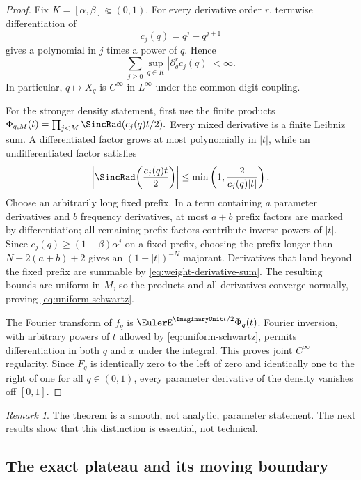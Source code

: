 \documentclass[11pt,oneside]{article}
\theoremstyle{definition}
\theoremstyle{remark}
\newtheorem{remark}[theorem]{Remark}
\begin{document}
\begin{proof}
Fix \(K=[\alpha,\beta]\Subset(0,1)\).  For every derivative order \(r\), termwise
differentiation of
\[
 c_j(q)=q^j-q^{j+1}
\]
gives a polynomial in \(j\) times a power of \(q\).  Hence
\begin{equation}
 \sum_{j\ge0}\sup_{q\in K}|\partial_q^r c_j(q)|<\infty.
 \label{eq:weight-derivative-sum}
\end{equation}
In particular, \(q\mapsto X_q\) is \(C^\infty\) in \(L^\infty\) under the common-digit
coupling.

For the stronger density statement, first use the finite products
\(
 \Phi_{q,M}(t)=\prod_{j<M}\SincRad(c_j(q)t/2).
\)
Every mixed derivative is a finite Leibniz sum.  A differentiated factor grows at most
polynomially in \(|t|\), while an undifferentiated factor satisfies
\[
 \left|\SincRad\!\left(\frac{c_j(q)t}{2}\right)\right|
 \le \min\left(1,\frac{2}{c_j(q)|t|}\right).
\]
Choose an arbitrarily long fixed prefix.  In a term containing \(a\) parameter derivatives
and \(b\) frequency derivatives, at most \(a+b\) prefix factors are marked by differentiation;
all remaining prefix factors contribute inverse powers of \(|t|\).  Since
\(c_j(q)\ge(1-\beta)\alpha^j\) on a fixed prefix, choosing the prefix longer than
\(N+2(a+b)+2\) gives an \((1+|t|)^{-N}\) majorant.  Derivatives that land beyond the fixed
prefix are summable by \eqref{eq:weight-derivative-sum}.  The resulting bounds are uniform in
\(M\), so the products and all derivatives converge normally, proving
\eqref{eq:uniform-schwartz}.

The Fourier transform of \(f_q\) is \(\EulerE^{\ImaginaryUnit t/2}\Phi_q(t)\).  Fourier inversion, with
arbitrary powers of \(t\) allowed by \eqref{eq:uniform-schwartz}, permits differentiation in
both \(q\) and \(x\) under the integral.  This proves joint \(C^\infty\) regularity.  Since
\(F_q\) is identically zero to the left of zero and identically one to the right of one for
all \(q\in(0,1)\), every parameter derivative of the density vanishes off \([0,1]\).
\end{proof}

\begin{remark}
The theorem is a smooth, not analytic, parameter statement.  The next results show that this
distinction is essential, not technical.
\end{remark}

\subsection{The exact plateau and its moving boundary}
\end{document}
